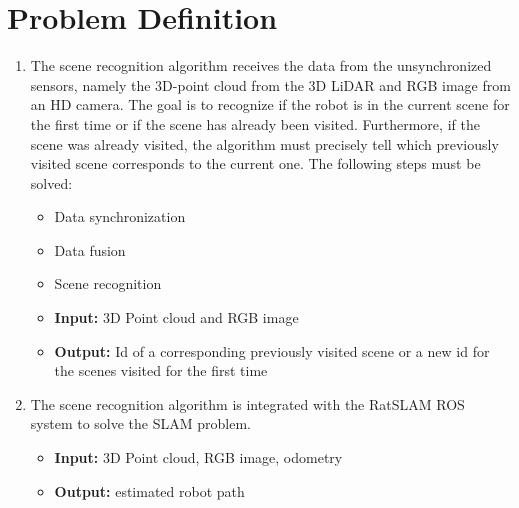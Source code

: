\section{Problem Definition}\label{section:problemDefinition}

\begin{enumerate}
    \item The scene recognition algorithm receives the data from the unsynchronized sensors, namely the 3D-point cloud from the 3D LiDAR and RGB image from an HD camera. The goal is to recognize if the robot is in the current scene for the first time or if the scene has already been visited. Furthermore, if the scene was already visited, the algorithm must precisely tell which previously visited scene corresponds to the current one. The following steps must be solved:
          \begin{itemize}
              \item Data synchronization
              \item Data fusion
              \item Scene recognition
                    \\
              \item \textbf{Input:} 3D Point cloud and RGB image
              \item \textbf{Output:} Id of a corresponding previously visited scene or a new id for the scenes visited for the first time
          \end{itemize}
    \item The scene recognition algorithm is integrated with the RatSLAM ROS system to solve the SLAM problem.
          \begin{itemize}
              \item \textbf{Input:} 3D Point cloud, RGB image, odometry
              \item \textbf{Output:} estimated robot path
          \end{itemize}
\end{enumerate}